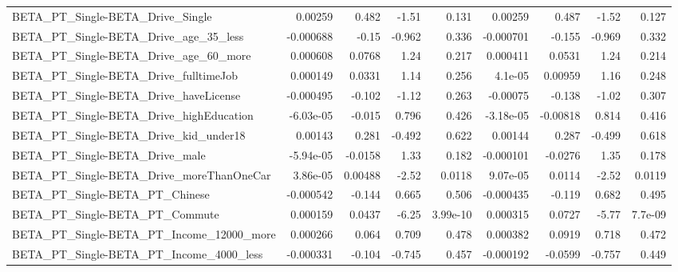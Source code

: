 \begin{tabular}{lrrrrrrrr}
BETA\_PT\_Single-BETA\_Drive\_Single                   &     0.00259 &        0.482 &    -1.51 &    0.131 &    0.00259 &       0.487 &        -1.52 &         0.127 \\
BETA\_PT\_Single-BETA\_Drive\_age\_35\_less              &   -0.000688 &        -0.15 &   -0.962 &    0.336 &  -0.000701 &      -0.155 &       -0.969 &         0.332 \\
BETA\_PT\_Single-BETA\_Drive\_age\_60\_more              &    0.000608 &       0.0768 &     1.24 &    0.217 &   0.000411 &      0.0531 &         1.24 &         0.214 \\
BETA\_PT\_Single-BETA\_Drive\_fulltimeJob              &    0.000149 &       0.0331 &     1.14 &    0.256 &    4.1e-05 &     0.00959 &         1.16 &         0.248 \\
BETA\_PT\_Single-BETA\_Drive\_haveLicense              &   -0.000495 &       -0.102 &    -1.12 &    0.263 &   -0.00075 &      -0.138 &        -1.02 &         0.307 \\
BETA\_PT\_Single-BETA\_Drive\_highEducation            &   -6.03e-05 &       -0.015 &    0.796 &    0.426 &  -3.18e-05 &    -0.00818 &        0.814 &         0.416 \\
BETA\_PT\_Single-BETA\_Drive\_kid\_under18              &     0.00143 &        0.281 &   -0.492 &    0.622 &    0.00144 &       0.287 &       -0.499 &         0.618 \\
BETA\_PT\_Single-BETA\_Drive\_male                     &   -5.94e-05 &      -0.0158 &     1.33 &    0.182 &  -0.000101 &     -0.0276 &         1.35 &         0.178 \\
BETA\_PT\_Single-BETA\_Drive\_moreThanOneCar           &    3.86e-05 &      0.00488 &    -2.52 &   0.0118 &   9.07e-05 &      0.0114 &        -2.52 &        0.0119 \\
BETA\_PT\_Single-BETA\_PT\_Chinese                     &   -0.000542 &       -0.144 &    0.665 &    0.506 &  -0.000435 &      -0.119 &        0.682 &         0.495 \\
BETA\_PT\_Single-BETA\_PT\_Commute                     &    0.000159 &       0.0437 &    -6.25 & 3.99e-10 &   0.000315 &      0.0727 &        -5.77 &       7.7e-09 \\
BETA\_PT\_Single-BETA\_PT\_Income\_12000\_more           &    0.000266 &        0.064 &    0.709 &    0.478 &   0.000382 &      0.0919 &        0.718 &         0.472 \\
BETA\_PT\_Single-BETA\_PT\_Income\_4000\_less            &   -0.000331 &       -0.104 &   -0.745 &    0.457 &  -0.000192 &     -0.0599 &       -0.757 &         0.449 \\

\end{tabular}
